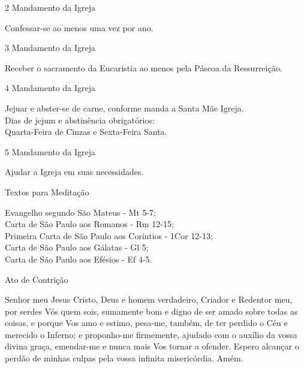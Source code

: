 \begin{center}
    2\textordmasculine{} Mandamento da Igreja
\end{center}
\begin{flushleft}
    Confessar-se ao menos uma vez por ano.
\end{flushleft}
\begin{center}
    3\textordmasculine{} Mandamento da Igreja
\end{center}
\begin{flushleft}
    Receber o sacramento da Eucaristia ao menos pela Páscoa da Ressurreição.
\end{flushleft}
\begin{center}
    4\textordmasculine{} Mandamento da Igreja
\end{center}
\begin{flushleft}
    Jejuar e abster-se de carne, conforme manda a Santa Mãe Igreja. \\
    \hfill{} \break{}
    Dias de jejum e abstinência obrigatórios: \\
    Quarta-Feira de Cinzas e Sexta-Feira Santa.
\end{flushleft}
\begin{center}
    5\textordmasculine{} Mandamento da Igreja
\end{center}
\begin{flushleft}
    Ajudar a Igreja em suas necessidades.
\end{flushleft}
\newpage
\begin{center}
    Textos para Meditação
\end{center}
\begin{flushleft}
    Evangelho segundo São Mateus - \textcolor{VioletRed2}{Mt 5-7}; \\
    Carta de São Paulo aos Romanos - \textcolor{VioletRed2}{Rm 12-15}; \\
    Primeira Carta de São Paulo aos Coríntios - \textcolor{VioletRed2}{1Cor 12-13}; \\
    Carta de São Paulo aos Gálatas - \textcolor{VioletRed2}{Gl 5}; \\
    Carta de São Paulo aos Efésios - \textcolor{VioletRed2}{Ef 4-5}.
\end{flushleft}
\begin{center}
    Ato de Contrição
\end{center}
\begin{flushleft}
    Senhor meu Jesus Cristo, Deus e homem verdadeiro, Criador e Redentor meu, por serdes Vós quem sois, sumamente bom e digno de ser amado sobre todas as coisas, e porque Vos amo e estimo, pesa-me, também, de ter perdido o Céu e merecido o Inferno; e proponho-me firmemente, ajudado com o auxílio da vossa divina graça, emendar-me e nunca mais Vos tornar a ofender. Espero alcançar o perdão de minhas culpas pela vossa infinita misericórdia. Amém.
\end{flushleft}
